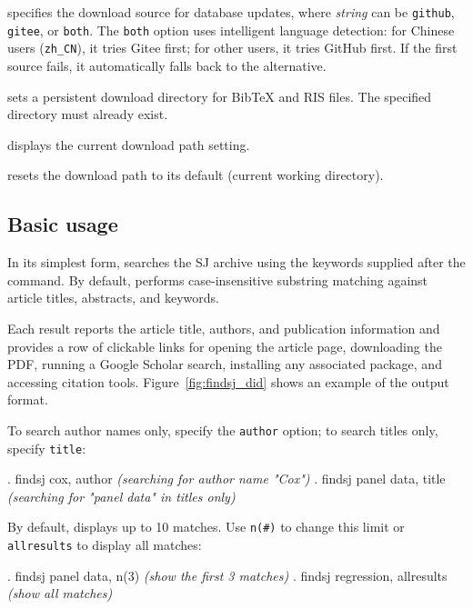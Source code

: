  specifies the download source for database updates, where {\it string} can be {\tt github}, {\tt gitee}, or {\tt both}. The {\tt both} option uses intelligent language detection: for Chinese users ({\tt zh\_CN}), it tries Gitee first; for other users, it tries GitHub first. If the first source fails, it automatically falls back to the alternative.

 sets a persistent download directory for BibTeX and RIS files. The specified directory must already exist.

 displays the current download path setting.

 resets the download path to its default (current working directory).

\subsection{Basic usage}

In its simplest form,  searches the SJ archive using the keywords supplied after the command. By default,  performs case-insensitive substring matching against article titles, abstracts, and keywords. 

Each result reports the article title, authors, and publication information and provides a row of clickable links for opening the article page, downloading the PDF, running a Google Scholar search, installing any associated package, and accessing citation tools. Figure~\ref{fig:findsj_did} shows an example of the output format.

To search author names only, specify the {\tt author} option; to search titles only, specify {\tt title}:

\begin{stlog}
. findsj cox, author
  {\it (searching for author name "Cox")}
{\smallskip}
. findsj panel data, title
  {\it (searching for "panel data" in titles only)}
\end{stlog}

By default,  displays up to 10 matches. Use {\tt n(\#)} to change this limit or {\tt allresults} to display all matches:

\begin{stlog}
. findsj panel data, n(3)
  {\it (show the first 3 matches)}
{\smallskip}
. findsj regression, allresults
  {\it (show all matches)}
\end{stlog}


